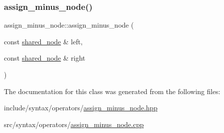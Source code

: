 \subsubsection{\texorpdfstring{assign\+\_\+minus\+\_\+node()}{assign\_minus\_node()}}
{\footnotesize\ttfamily assign\+\_\+minus\+\_\+node\+::assign\+\_\+minus\+\_\+node (\begin{DoxyParamCaption}\item[{const \hyperlink{namespacejawe_a3f307481d921b6cbb50cc8511fc2b544}{shared\+\_\+node} \&}]{left,  }\item[{const \hyperlink{namespacejawe_a3f307481d921b6cbb50cc8511fc2b544}{shared\+\_\+node} \&}]{right }\end{DoxyParamCaption})}



The documentation for this class was generated from the following files\+:\begin{DoxyCompactItemize}
\item 
include/syntax/operators/\hyperlink{assign__minus__node_8hpp}{assign\+\_\+minus\+\_\+node.\+hpp}\item 
src/syntax/operators/\hyperlink{assign__minus__node_8cpp}{assign\+\_\+minus\+\_\+node.\+cpp}\end{DoxyCompactItemize}
